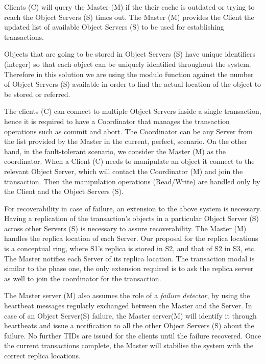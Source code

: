 \documentclass[times, 10pt,twocolumn]{article}
\begin{document}
Clients (C) will query the Master (M) if the their cache is outdated or trying to reach the Object Servers (S) times out. The Master (M) provides the Client the updated list of available Object Servers (S) to be used for establishing transactions.

Objects that are going to be stored in Object Servers (S) have unique identifiers (integer) so that each object can be uniquely identified throughout the system. Therefore in this solution we are using the modulo function against the number of Object Servers (S) available in order to find the actual location of the object to be stored or referred.

The clients (C) can connect to multiple Object Servers inside a single transaction, hence it is required to have a Coordinator that manages the transaction operations such as commit and abort.
The Coordinator can be any Server from the list provided by the Master in the current, perfect, scenario. On the other hand, in the fault-tolerant scenario, we consider the Master (M) as the coordinator. When a Client (C) needs to manipulate an object it connect to the relevant Object Server, which will contact the Coordinator (M) and join the transaction. Then the manipulation operations (Read/Write) are handled only by the Client and the Object Servers (S).

\label{subsec:ftsys}
For recoverability in case of failure, an extension to the above system is necessary. Having a replication of the transaction's objects in a particular Object Server (S) across other Servers (S) is necessary to assure recoverability. The Master (M) handles the replica location of each Server. Our proposal for the replica locations is a conceptual ring, where S1's replica is stored in S2, and that of S2 in S3, etc. The Master notifies each Server of its replica location. The transaction modal is similar to the phase one, the only extension required is to ask the replica server as well to join the coordinator for the transaction.

The Master server (M) also assumes the role of a {\it failure detector}, by using the heartbeat messages regularly exchanged between the Master and the Server. In case of an Object Server(S) failure, the Master server(M) will identify it through heartbeats and issue a notification to all the other Object Servers (S) about the failure. No further TIDs are issued for the clients until the failure recovered. Once the current transactions complete, the Master will stabilise the system with the correct replica locations.
\end{document}
